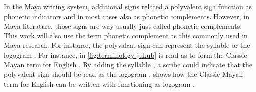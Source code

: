 \documentclass[../main.tex]{subfiles}
\begin{document}
In the Maya writing system, additional signs related a polyvalent sign function 
as phonetic indicators and in most cases also as phonetic complements.
However, in Maya literature, those signs are way usually just called phonetic complements.
This work will also use the term phonetic complement as this commonly used in Maya research.
For instance, the polyvalent sign  can represent the syllable  or the
logogram .
For instance, in \cref{fig:terminology-jukub}  is read as  to form
the Classic Mayan term  for English .
By adding the syllable , a scribe could indicate that the polyvalent sign
should be read as the logogram .
 shows how the Classic Mayan term  
for English  can be written with  functioning as 
logogram .
\end{document}
